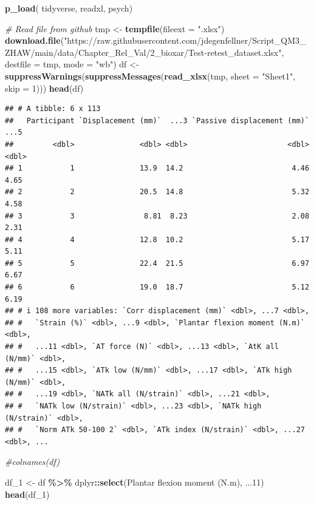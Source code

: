 \documentclass[
]{book}
\newenvironment{Shaded}{\begin{snugshade}}{\end{snugshade}}
\newcommand{\AttributeTok}[1]{\textcolor[rgb]{0.13,0.29,0.53}{#1}}
\newcommand{\CommentTok}[1]{\textcolor[rgb]{0.56,0.35,0.01}{\textit{#1}}}
\newcommand{\DecValTok}[1]{\textcolor[rgb]{0.00,0.00,0.81}{#1}}
\newcommand{\FunctionTok}[1]{\textcolor[rgb]{0.13,0.29,0.53}{\textbf{#1}}}
\newcommand{\NormalTok}[1]{#1}
\newcommand{\OtherTok}[1]{\textcolor[rgb]{0.56,0.35,0.01}{#1}}
\newcommand{\SpecialCharTok}[1]{\textcolor[rgb]{0.81,0.36,0.00}{\textbf{#1}}}
\newcommand{\StringTok}[1]{\textcolor[rgb]{0.31,0.60,0.02}{#1}}
\begin{document}
\begin{Shaded}
\begin{Highlighting}[]
\FunctionTok{p\_load}\NormalTok{(}
\NormalTok{  tidyverse,}
\NormalTok{  readxl,}
\NormalTok{  psych)}

\CommentTok{\# Read file from github}
\NormalTok{tmp }\OtherTok{\textless{}{-}} \FunctionTok{tempfile}\NormalTok{(}\AttributeTok{fileext =} \StringTok{".xlsx"}\NormalTok{)}
\FunctionTok{download.file}\NormalTok{(}\StringTok{"https://raw.githubusercontent.com/jdegenfellner/Script\_QM3\_ZHAW/main/data/Chapter\_Rel\_Val/2\_bioxar/Test{-}retest\_dataset.xlsx"}\NormalTok{, }
              \AttributeTok{destfile =}\NormalTok{ tmp, }\AttributeTok{mode =} \StringTok{"wb"}\NormalTok{)}
\NormalTok{df }\OtherTok{\textless{}{-}} \FunctionTok{suppressWarnings}\NormalTok{(}\FunctionTok{suppressMessages}\NormalTok{(}\FunctionTok{read\_xlsx}\NormalTok{(tmp, }\AttributeTok{sheet =} \StringTok{"Sheet1"}\NormalTok{, }\AttributeTok{skip =} \DecValTok{1}\NormalTok{)))}
\FunctionTok{head}\NormalTok{(df)}
\end{Highlighting}
\end{Shaded}

\begin{verbatim}
## # A tibble: 6 x 113
##   Participant `Displacement (mm)`  ...3 `Passive displacement (mm)`  ...5
##         <dbl>               <dbl> <dbl>                       <dbl> <dbl>
## 1           1               13.9  14.2                         4.46  4.65
## 2           2               20.5  14.8                         5.32  4.58
## 3           3                8.81  8.23                        2.08  2.31
## 4           4               12.8  10.2                         5.17  5.11
## 5           5               22.4  21.5                         6.97  6.67
## 6           6               19.0  18.7                         5.12  6.19
## # i 108 more variables: `Corr displacement (mm)` <dbl>, ...7 <dbl>,
## #   `Strain (%)` <dbl>, ...9 <dbl>, `Plantar flexion moment (N.m)` <dbl>,
## #   ...11 <dbl>, `AT force (N)` <dbl>, ...13 <dbl>, `AtK all (N/mm)` <dbl>,
## #   ...15 <dbl>, `ATk low (N/mm)` <dbl>, ...17 <dbl>, `ATk high (N/mm)` <dbl>,
## #   ...19 <dbl>, `NATk all (N/strain)` <dbl>, ...21 <dbl>,
## #   `NATk low (N/strain)` <dbl>, ...23 <dbl>, `NATk high (N/strain)` <dbl>,
## #   `Norm ATk 50-100 2` <dbl>, `ATk index (N/strain)` <dbl>, ...27 <dbl>, ...
\end{verbatim}

\begin{Shaded}
\begin{Highlighting}[]
\CommentTok{\#colnames(df)}

\NormalTok{df\_1 }\OtherTok{\textless{}{-}}\NormalTok{ df }\SpecialCharTok{\%\textgreater{}\%}\NormalTok{ dplyr}\SpecialCharTok{::}\FunctionTok{select}\NormalTok{(}\StringTok{\textasciigrave{}}\AttributeTok{Plantar flexion moment (N.m)}\StringTok{\textasciigrave{}}\NormalTok{, }\StringTok{\textasciigrave{}}\AttributeTok{...11}\StringTok{\textasciigrave{}}\NormalTok{)}
\FunctionTok{head}\NormalTok{(df\_1)}
\end{Highlighting}
\end{Shaded}
\end{document}
